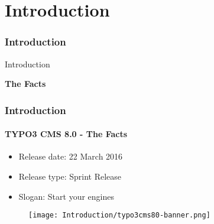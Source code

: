 %

\section{Introduction}
\begin{frame}[fragile]
	\frametitle{Introduction}

	\begin{center}\huge{Introduction}\end{center}
	\begin{center}\huge{\color{typo3darkgrey}\textbf{The Facts}}\end{center}

\end{frame}

\begin{frame}[fragile]
	\frametitle{Introduction}
	\framesubtitle{TYPO3 CMS 8.0 - The Facts}

	\begin{itemize}
		\item Release date: 22 March 2016
		\item Release type: Sprint Release
		\item Slogan: Start your engines
	\end{itemize}

	\begin{figure}
		\texttt{[image: Introduction/typo3cms80-banner.png]}
	\end{figure}

\end{frame}

